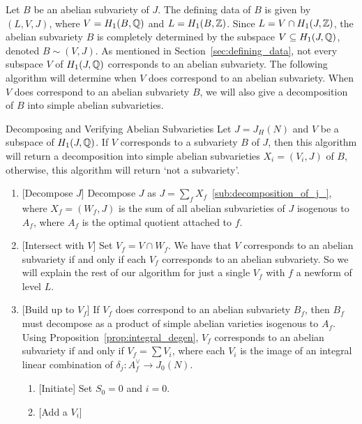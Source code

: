 Let $B$ be an abelian subvariety of $J$. The defining data of $B$ is given by
$(L, V, J)$, where $V=H_1(B,\mathbb{Q})$ and $L = H_1(B, \mathbb{Z})$. Since $L = V\cap
H_1(J, \mathbb{Z})$, the abelian subvariety $B$ is completely determined by the
subspace $V\subseteq H_1(J, \mathbb{Q})$, denoted $B\sim (V, J)$. As mentioned in
Section~\ref{sec:defining_data}, not every subspace $V$ of $H_1(J, \mathbb{Q})$
corresponds to an abelian subvariety. The following algorithm will determine
when $V$ does correspond to an abelian subvariety. When $V$ does correspond to
an abelian subvariety $B$, we will also give a decomposition of $B$ into simple
abelian subvarieties.

\begin{algorithm}{Decomposing and Verifying Abelian Subvarieties}
    \label{alg:decomp_and_verify_subvarieties}
    Let $J=J_H(N)$ and $V$ be a subspace of $H_1(J, \mathbb{Q})$. If $V$ corresponds
    to a subvariety $B$ of $J$, then this algorithm will return a decomposition
    into simple abelian subvarieties $X_i=(V_i, J)$ of $B$, otherwise, this
    algorithm will return `not a subvariety'.
    \begin{enumerate}
        \item{} [Decompose $J$]
            Decompose $J$ as $J=\sum_f X_f$~\ref{sub:decomposition_of_j_},
            where $X_f=(W_f, J)$ is the sum of all abelian subvarieties of $J$
            isogenous to $A_f$, where $A_f$ is the optimal quotient attached to
            $f$.
        \item{} [Intersect with $V$]
            Set $V_f=V\cap W_f$. We have that $V$ corresponds to an abelian
            subvariety if and only if each $V_f$ corresponds to an abelian
            subvariety. So we will explain the rest of our algorithm for just a
            single $V_f$ with $f$ a newform of level $L$.
        \item{} [Build up to $V_f$]
            If $V_f$ does correspond to an abelian subvariety $B_f$, then $B_f$
            must decompose as a product of simple abelian varieties isogenous
            to $A_f$. Using Proposition~\ref{prop:integral_degen}, $V_f$
            corresponds to an abelian subvariety if and only if $V_f=\sum V_i$,
            where each $V_i$ is the image of an integral linear combination of
            $\delta_j:A_f ^\vee \to J_0(N)$.
            \begin{enumerate}
                \item{} [Initiate]
                    Set $S_0=0$ and $i=0$.
                \item{} [Add a $V_i$]

\end{enumerate}
\end{enumerate}
\end{algorithm}
